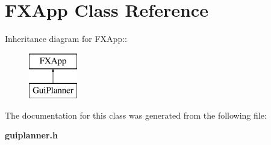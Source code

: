 \section{FXApp  Class Reference}
\label{class_FXApp}
Inheritance diagram for FXApp::\begin{figure}[H]
\begin{center}
\leavevmode
\includegraphics[height=2cm]{class_FXApp}
\end{center}
\end{figure}


The documentation for this class was generated from the following file:\begin{CompactItemize}
\item 
{\bf guiplanner.h}\end{CompactItemize}
